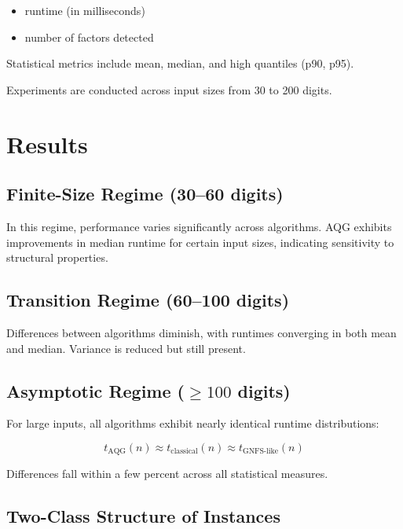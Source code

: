 \documentclass[11pt,a4paper]{article}
\begin{document}
	\begin{itemize}
		\item runtime (in milliseconds)
		\item number of factors detected
	\end{itemize}
	
	Statistical metrics include mean, median, and high quantiles (p90, p95).
	
	Experiments are conducted across input sizes from 30 to 200 digits.
	
	\section{Results}
	
	\subsection{Finite-Size Regime (30--60 digits)}
	
	In this regime, performance varies significantly across algorithms. AQG exhibits improvements in median runtime for certain input sizes, indicating sensitivity to structural properties.
	
	\subsection{Transition Regime (60--100 digits)}
	
	Differences between algorithms diminish, with runtimes converging in both mean and median. Variance is reduced but still present.
	
	\subsection{Asymptotic Regime ($\geq 100$ digits)}
	
	For large inputs, all algorithms exhibit nearly identical runtime distributions:
	
	\begin{equation}
		t_{\text{AQG}}(n) \approx t_{\text{classical}}(n) \approx t_{\text{GNFS-like}}(n)
	\end{equation}
	
	Differences fall within a few percent across all statistical measures.
	
	\subsection{Two-Class Structure of Instances}
	
\end{document}
